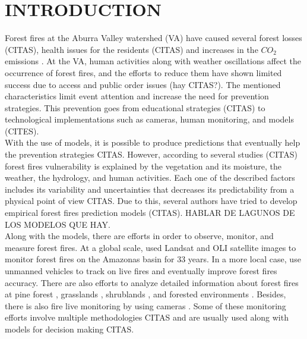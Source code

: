 \section{INTRODUCTION}
Forest fires at the Aburra Valley watershed (VA) have caused several forest losses (CITAS), health issues for the residents (CITAS) and increases in the $CO_2$ emissions \citep{Andreae2001}. At the VA, human activities along with weather oscillations affect the occurrence of forest fires, and the efforts to reduce them have shown limited success due to access and public order issues (hay CITAS?). The mentioned characteristics limit event attention and increase the need for prevention strategies.  This prevention goes from educational strategies (CITAS) to technological implementations such as cameras, human monitoring, and models (CITES).\\

With the use of models, it is possible to produce predictions that eventually help the prevention strategies CITAS.  However, according to several studies (CITAS) forest fires vulnerability is explained by the vegetation and its moisture, the weather, the hydrology, and human activities. Each one of the described factors includes its variability and uncertainties that decreases its predictability from a physical point of view CITAS. Due to this, several authors have tried to develop empirical forest fires prediction models (CITAS). HABLAR DE LAGUNOS DE LOS MODELOS QUE HAY.\\

Along with the models, there are efforts in order to observe, monitor, and measure forest fires.  At a global scale, \citep{Fearnside2018} used Landsat and OLI satellite images to monitor forest fires on the Amazonas basin for 33 years. In a more local case, \citep{Valero2017} use unmanned vehicles to track on live fires and eventually improve forest fires accuracy. There are also efforts to analyze detailed information about forest fires at pine forest \citep{ElHoussami2017}, grasslands \citet{Roger2015}, shrublands \citet{Santoni2006}, and forested environments \citet{Wotton2012}. Besides, there is also fire live monitoring by using cameras \citep{Bao2015}. Some of these monitoring efforts involve multiple methodologies CITAS and are usually used along with models for decision making CITAS.\\

